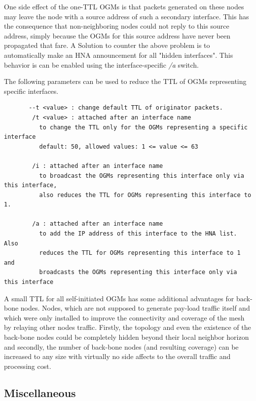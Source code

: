 \documentclass[11pt]{article}
\begin{document}
One side effect of the one-TTL OGMs is that packets generated on these nodes may leave the node with a source address of such a secondary interface. 
%
This has the consequence that non-neighboring nodes could not reply to this source address, simply because the OGMs for this source address have never been propagated that fare.
A Solution to counter the above problem is to automatically make an HNA announcement for all "hidden interfaces". 
This behavior is can be enabled using the interface-specific \emph{/a} switch. 

The following parameters can be used to reduce the TTL of OGMs representing specific interfaces.

\begin{small} \begin{verbatim}
       --t <value> : change default TTL of originator packets.
        /t <value> : attached after an interface name
          to change the TTL only for the OGMs representing a specific interface
          default: 50, allowed values: 1 <= value <= 63

        /i : attached after an interface name
          to broadcast the OGMs representing this interface only via this interface,
          also reduces the TTL for OGMs representing this interface to 1.

        /a : attached after an interface name
          to add the IP address of this interface to the HNA list. Also
          reduces the TTL for OGMs representing this interface to 1 and
          broadcasts the OGMs representing this interface only via this interface
\end{verbatim} \end{small}
 
A small TTL for all self-initiated OGMs has some additional advantages for back-bone nodes. Nodes, which are not supposed to generate pay-load traffic itself and which were only installed to improve the connectivity and coverage of the mesh by relaying other nodes traffic.
%
Firstly, the topology and even the existence of the back-bone nodes could be completely hidden beyond their local neighbor horizon and secondly, the number of back-bone nodes (and resulting coverage) can be increased to any size with virtually no side affects to the overall traffic and processing cost.


\subsection{Miscellaneous}
\end{document}
